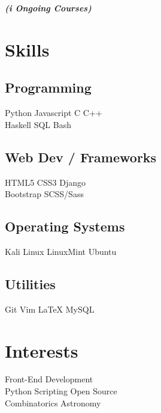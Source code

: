 \documentclass[]{deedy-resume-openfont}
\begin{document}
\begin{minipage}[t]{0.33\textwidth}
{\footnotesize \textit{\textbf{ (\textit{i} Ongoing Courses)}}}


\section{Skills}
\subsection{Programming}
Python \textbullet{} Javascript \textbullet{} C \textbullet{} C++ \\  
 \vspace{0.1 cm}
Haskell \textbullet{} SQL \textbullet{} Bash \\
\vspace{0.3 cm} 
\subsection{Web Dev / Frameworks}
HTML5 \textbullet{} CSS3 \textbullet{}  Django \\ 
Bootstrap \textbullet{} SCSS/Sass \\
\vspace{0.3 cm}
\subsection{Operating Systems}
Kali Linux \textbullet{} LinuxMint \textbullet{} Ubuntu \\
\vspace{0.3 cm}
\subsection{Utilities}
Git \textbullet{} Vim \textbullet{} \LaTeX{} \textbullet{} MySQL  \\


\section{Interests}
Front-End Development  \\
Python Scripting \textbullet{} Open Source \\
Combinatorics  \textbullet{} Astronomy \\
%
%

\end{minipage} 
\end{document}
